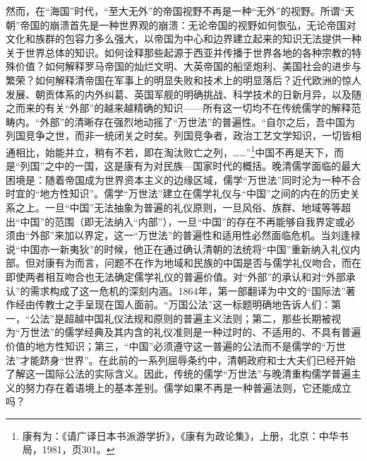 \documentclass[a4paper, 12pt, openright]{ctexbook}
\begin{document}
然而，在“海国”时代，“至大无外”的帝国视野不再是一种“无外”的视野。所谓“天朝”帝国的崩溃首先是一种世界观的崩溃：无论帝国的视野如何恢弘，无论帝国对文化和族群的包容力多么强大，以帝国为中心和边界建立起来的知识无法提供一种关于世界总体的知识。如何诠释那些起源于西亚并传播于世界各地的各种宗教的特殊价值？如何解释罗马帝国的灿烂文明、大英帝国的船坚炮利、美国社会的进步与繁荣？如何解释清帝国在军事上的明显失败和技术上的明显落后？近代欧洲的惊人发展、朝贡体系的内外纠葛、英国军舰的明确挑战、科学技术的日新月异，以及随之而来的有关“外部”的越来越精确的知识——所有这一切均不在传统儒学的解释范畴内。“外部”的清晰存在强烈地动摇了“万世法”的普遍性。“自尔之后，吾中国为列国竞争之世，而非一统闭关之时矣。列国竞争者，政治工艺文学知识，一切皆相通相比，始能并立，稍有不若，即在淘汰败亡之列，……”\footnote{康有为：《请广译日本书派游学折》，《康有为政论集》，上册，北京：中华书局，1981，页301。}中国不再是天下，而是“列国”之中的一国，这是康有为对民族—国家时代的概括。晚清儒学面临的最大困境是：随着帝国成为世界资本主义的边缘区域，儒学“万世法”同时沦为一种不合时宜的“地方性知识”。儒学“万世法”建立在儒学礼仪与“中国”之间的内在的历史关系之上。一旦“中国”无法抽象为普遍的礼仪原则，一旦风俗、族群、地域等等超出“中国”的范围（即无法纳入“内部”），一旦“中国”的存在不再能够自我界定或必须由“外部”来加以界定，这一“万世法”的普遍性和适用性必然面临危机。当刘逢禄说“中国亦一新夷狄”的时候，他正在通过确认清朝的法统将“中国”重新纳入礼仪内部。但对康有为而言，问题不在作为地域和民族的中国是否与儒学礼仪吻合，而在即使两者相互吻合也无法确定儒学礼仪的普遍价值。对“外部”的承认和对“外部承认”的需求构成了这一危机的深刻内涵。1864年，第一部翻译为中文的“国际法”著作经由传教士之手呈现在国人面前。“万国公法”这一标题明确地告诉人们：第一，“公法”是超越中国礼仪法规和原则的普遍主义法则；第二，那些长期被视为“万世法”的儒学经典及其内含的礼仪准则是一种过时的、不适用的、不具有普遍价值的地方性知识；第三，“中国”必须遵守这一普遍的公法而不是儒学的“万世法”才能跻身“世界”。在此前的一系列屈辱条约中，清朝政府和士大夫们已经开始了解这一国际公法的实际含义。因此，传统的儒学“万世法”与晚清重构儒学普遍主义的努力存在着语境上的基本差别。儒学如果不再是一种普遍法则，它还能成立吗？
\end{document}
